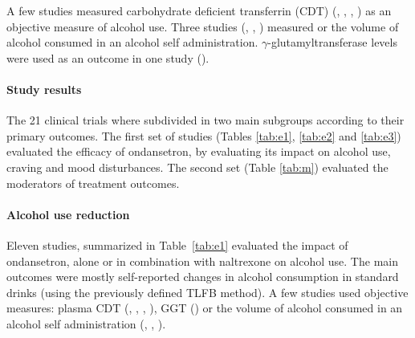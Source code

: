 A few studies measured carbohydrate deficient transferrin (CDT) (\cite{johnson_ondansetron_2000}, \cite{ait-daoud_combining_2001-1}, \cite{kranzler_effects_2003}, \cite{sherwood_brown_randomized_2021}) as an objective measure of alcohol use. Three studies (\cite{kenna_within-group_2009}, \cite{kenna_ondansetron_2014}, \cite{kenna_ondansetron_2014-1}) measured  or the volume of alcohol consumed in an alcohol self administration. $\gamma$-glutamyltransferase levels were used as an outcome in one study (\cite{sherwood_brown_randomized_2021}).



\paragraph{Study results}
The 21 clinical trials where subdivided in two main subgroups according to their primary outcomes. The first set of studies (Tables \ref{tab:e1}, \ref{tab:e2} and \ref{tab:e3}) evaluated the efficacy of ondansetron, by evaluating its impact on alcohol use, craving and mood disturbances. The second set (Table \ref{tab:m}) evaluated the moderators of treatment outcomes.

\paragraph{Alcohol use reduction}
Eleven studies, summarized in Table~\ref{tab:e1} evaluated the impact of ondansetron, alone or in combination with naltrexone on alcohol use. The main outcomes were mostly self-reported changes in alcohol consumption in standard drinks (using the previously defined TLFB method). A few studies used objective measures: plasma CDT (\cite{johnson_ondansetron_2000}, \cite{ait-daoud_combining_2001-1}, \cite{kranzler_effects_2003}, \cite{sherwood_brown_randomized_2021}), GGT (\cite{sherwood_brown_randomized_2021}) or the volume of alcohol consumed in an alcohol self administration  (\cite{kenna_within-group_2009}, \cite{kenna_ondansetron_2014}, \cite{kenna_ondansetron_2014-1}).

